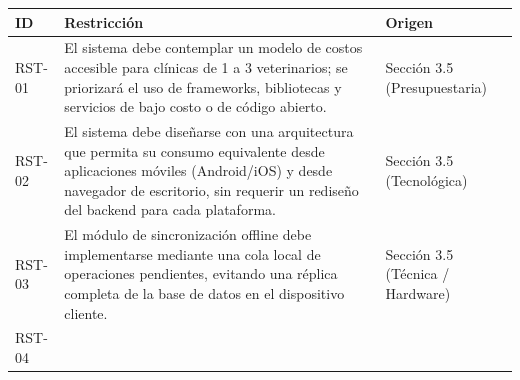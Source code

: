 \documentclass[
]{article}
\newcounter{none} %
\begin{document}
{\def\LTcaptype{none} %
\begin{longtable}[]{|
  >{\raggedright\arraybackslash}p{}|
  >{\raggedright\arraybackslash}p{}|
  >{\raggedright\arraybackslash}p{}|}
\hline
\begin{minipage}[b]{\linewidth}\centering
\textbf{ID}
\end{minipage} & \begin{minipage}[b]{\linewidth}\centering
\textbf{Restricción}
\end{minipage} & \begin{minipage}[b]{\linewidth}\raggedright
\textbf{Origen}
\end{minipage} \\
\hline
\endhead
\hline
\endlastfoot
RST-01 & \begin{minipage}[t]{\linewidth}\raggedright
El sistema debe contemplar un modelo de costos accesible para clínicas
de 1 a 3 veterinarios; se priorizará el uso de frameworks, bibliotecas
y servicios de bajo costo o de código abierto.
\end{minipage} & \begin{minipage}[t]{\linewidth}\raggedright
Sección 3.5 (Presupuestaria)
\end{minipage} \\
\hline
RST-02 & \begin{minipage}[t]{\linewidth}\raggedright
El sistema debe diseñarse con una arquitectura que permita su consumo
equivalente desde aplicaciones móviles (Android/iOS) y desde navegador
de escritorio, sin requerir un rediseño del backend para cada
plataforma.
\end{minipage} & \begin{minipage}[t]{\linewidth}\raggedright
Sección 3.5 (Tecnológica)
\end{minipage} \\
\hline
RST-03 & \begin{minipage}[t]{\linewidth}\raggedright
El módulo de sincronización offline debe implementarse mediante una
cola local de operaciones pendientes, evitando una réplica completa de
la base de datos en el dispositivo cliente.
\end{minipage} & \begin{minipage}[t]{\linewidth}\raggedright
Sección 3.5 (Técnica / Hardware)
\end{minipage} \\
\hline
RST-04 & \begin{minipage}[t]{\linewidth}\raggedright

\end{minipage}
\end{longtable}}
\end{document}
